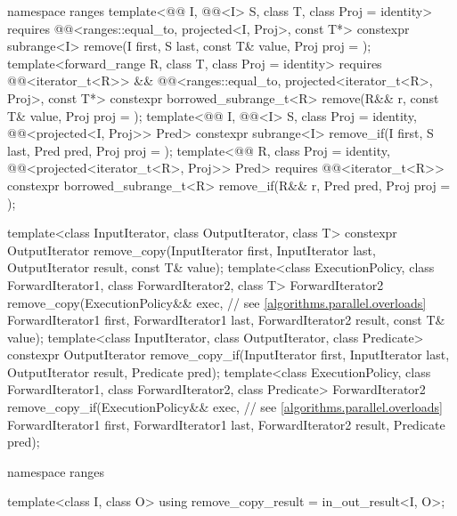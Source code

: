 \begin{codeblock}
{  namespace ranges {
    template<@@ I, @@<I> S, class T, class Proj = identity>
      requires @@<ranges::equal_to, projected<I, Proj>, const T*>
      constexpr subrange<I> remove(I first, S last, const T& value, Proj proj = {});
    template<forward_range R, class T, class Proj = identity>
      requires @@<iterator_t<R>> &&
               @@<ranges::equal_to,
                                         projected<iterator_t<R>, Proj>, const T*>
      constexpr borrowed_subrange_t<R>
        remove(R&& r, const T& value, Proj proj = {});
    template<@@ I, @@<I> S, class Proj = identity,
             @@<projected<I, Proj>> Pred>
      constexpr subrange<I> remove_if(I first, S last, Pred pred, Proj proj = {});
    template<@@ R, class Proj = identity,
             @@<projected<iterator_t<R>, Proj>> Pred>
      requires @@<iterator_t<R>>
      constexpr borrowed_subrange_t<R>
        remove_if(R&& r, Pred pred, Proj proj = {});
  }

  template<class InputIterator, class OutputIterator, class T>
    constexpr OutputIterator
      remove_copy(InputIterator first, InputIterator last,
                  OutputIterator result, const T& value);
  template<class ExecutionPolicy, class ForwardIterator1, class ForwardIterator2,
           class T>
    ForwardIterator2
      remove_copy(ExecutionPolicy&& exec,                       // see \ref{algorithms.parallel.overloads}
                  ForwardIterator1 first, ForwardIterator1 last,
                  ForwardIterator2 result, const T& value);
  template<class InputIterator, class OutputIterator, class Predicate>
    constexpr OutputIterator
      remove_copy_if(InputIterator first, InputIterator last,
                     OutputIterator result, Predicate pred);
  template<class ExecutionPolicy, class ForwardIterator1, class ForwardIterator2,
           class Predicate>
    ForwardIterator2
      remove_copy_if(ExecutionPolicy&& exec,                    // see \ref{algorithms.parallel.overloads}
                     ForwardIterator1 first, ForwardIterator1 last,
                     ForwardIterator2 result, Predicate pred);

  namespace ranges {
    template<class I, class O>
      using remove_copy_result = in_out_result<I, O>;

}}
\end{codeblock}

